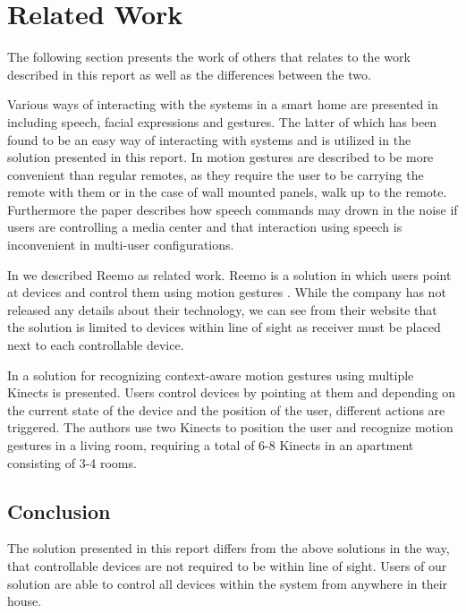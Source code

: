 \section{Related Work}
\label{sec:related-work}

The following section presents the work of others that relates to the work described in this report as well as the differences between the two.

Various ways of interacting with the systems in a smart home are presented in \cite[pp. 9-10]{cook2007smart} including speech, facial expressions and gestures. The latter of which has been found to be an easy way of interacting with systems \cite[p. 6]{rahman2011motion} and is utilized in the solution presented in this report. In \cite[pp. 2-3]{starner2000gesture} motion gestures are described to be more convenient than regular remotes, as they require the user to be carrying the remote with them or in the case of wall mounted panels, walk up to the remote. Furthermore the paper describes how speech commands may drown in the noise if users are controlling a media center and that interaction using speech is inconvenient in multi-user configurations.

In \cite[pp. 9-11]{prespecialisation} we described Reemo as related work. Reemo is a solution in which users point at devices and control them using motion gestures \cite{reemo:about}. While the company has not released any details about their technology, we can see from their website that the solution is limited to devices within line of sight as receiver must be placed next to each controllable device.

In \cite{caon2011context} a solution for recognizing context-aware motion gestures using multiple Kinects is presented. Users control devices by pointing at them and depending on the current state of the device and the position of the user, different actions are triggered.
The authors use two Kinects to position the user and recognize motion gestures in a living room, requiring a total of 6-8 Kinects in an apartment consisting of 3-4 rooms.

\subsection{Conclusion}

The solution presented in this report differs from the above solutions in the way, that controllable devices are not required to be within line of sight. Users of our solution are able to control all devices within the system from anywhere in their house.

